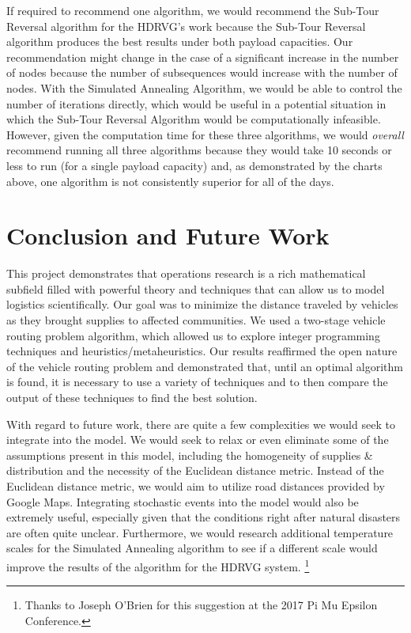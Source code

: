 \documentclass[11pt]{article}
\begin{document}
If required to recommend one algorithm, we would recommend the Sub-Tour Reversal algorithm for the HDRVG's work because the Sub-Tour Reversal algorithm produces the best results under both payload capacities.  Our recommendation might change in the case of a significant increase in the number of nodes because the number of subsequences would increase with the number of nodes. %
With the Simulated Annealing Algorithm, we would be able to control the number of iterations directly, which would be useful in a potential situation in which the Sub-Tour Reversal Algorithm would be computationally infeasible.  However, given the computation time for these three algorithms, we would \textit{overall} recommend running all three algorithms because they would take 10 seconds or less to run (for a single payload capacity) and, as demonstrated by the charts above, one algorithm is not consistently superior for all of the days.




\section{Conclusion and Future Work}

This project demonstrates that operations research is a rich mathematical subfield filled with powerful theory and techniques that can allow us to model logistics scientifically.  Our goal was to minimize the distance traveled by vehicles as they brought supplies to affected communities.  We used a two-stage vehicle routing problem algorithm, which allowed us to explore integer programming techniques and heuristics/metaheuristics.  Our results reaffirmed the open nature of the vehicle routing problem and demonstrated that, until an optimal algorithm is found, it is necessary to use a variety of techniques and to then compare the output of these techniques to find the best solution.  

With regard to future work, there are quite a few complexities we would seek to integrate into the model.  We would seek to relax or even eliminate some of the assumptions present in this model, including the homogeneity of supplies \& distribution and the necessity of the Euclidean distance metric.  Instead of the Euclidean distance metric, we would aim to utilize road distances provided by Google Maps.  Integrating stochastic events into the model would also be extremely useful, especially given that the conditions right after natural disasters are often quite unclear.  Furthermore, we would research additional temperature scales for the Simulated Annealing algorithm to see if a different scale would improve the results of the algorithm for the HDRVG system. \footnote{Thanks to Joseph O'Brien for this suggestion at the 2017 Pi Mu Epsilon Conference.}  
\end{document}
